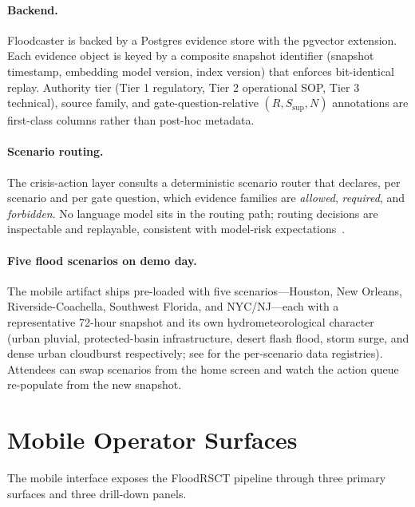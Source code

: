 \documentclass[sigconf,nonacm=true,review,authoryear]{acmart}
\begin{document}
\paragraph{Backend.}
Floodcaster is backed by a Postgres evidence store with the pgvector
extension. Each evidence object is keyed by a composite snapshot
identifier (snapshot timestamp, embedding model version, index
version) that enforces bit-identical replay. Authority tier (Tier 1
regulatory, Tier 2 operational SOP, Tier 3 technical), source family,
and gate-question-relative $(R, S_{\text{sup}}, N)$ annotations are
first-class columns rather than post-hoc metadata.

\paragraph{Scenario routing.}
The crisis-action layer consults a deterministic scenario router that
declares, per scenario and per gate question, which evidence families
are \emph{allowed}, \emph{required}, and \emph{forbidden}. No language
model sits in the routing path; routing decisions are inspectable and
replayable, consistent with model-risk
expectations~\citep{sr11-7,nistairmf}.

\paragraph{Five flood scenarios on demo day.}
The mobile artifact ships pre-loaded with five scenarios---Houston,
New Orleans, Riverside-Coachella, Southwest Florida, and NYC/NJ---each
with a representative 72-hour snapshot and its own hydrometeorological
character (urban pluvial, protected-basin infrastructure, desert flash
flood, storm surge, and dense urban cloudburst respectively; see
\citet{martin2026floodrsct} for the per-scenario data registries).
Attendees can swap scenarios from the home screen and watch the
action queue re-populate from the new snapshot.

\section{Mobile Operator Surfaces}
\label{sec:demo-surfaces}

The mobile interface exposes the FloodRSCT pipeline through three
primary surfaces and three drill-down panels.
\end{document}
